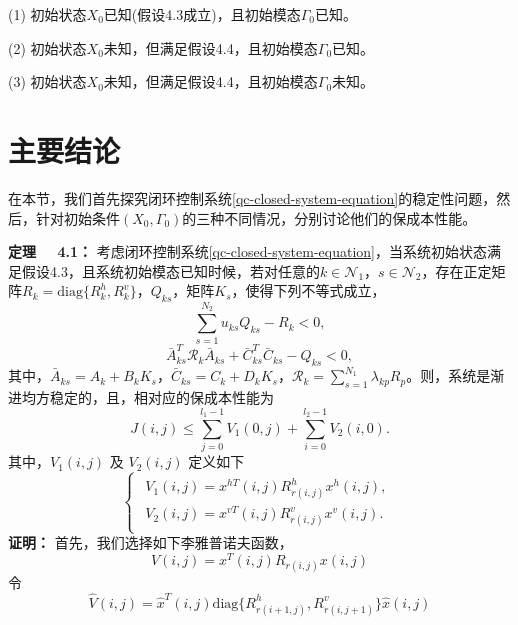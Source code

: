 	(1) 初始状态$X_{0}$已知(假设4.3成立)，且初始模态$\varGamma_{0}$已知。
	
	(2) 初始状态$X_{0}$未知，但满足假设4.4，且初始模态$\varGamma_{0}$已知。
	
	(3) 初始状态$X_{0}$未知，但满足假设4.4，且初始模态$\varGamma_{0}$未知。
	

\section{主要结论}
	在本节，我们首先探究闭环控制系统\eqref{qc-closed-system-equation}的稳定性问题，然后，针对初始条件$(X_{0}, \varGamma_{0})$的三种不同情况，分别讨论他们的保成本性能。
	
	{\bf 定理 \ \ 4.1：} 
	考虑闭环控制系统\eqref{qc-closed-system-equation}，当系统初始状态满足假设4.3，且系统初始模态已知时候，若对任意的$k\in\mathcal{N}_{1}$，$s\in\mathcal{N}_2$，存在正定矩阵$R_{k}=\mathrm{diag}\{R^{h}_{k},R^{v}_{k}\}$，$Q_{ks}$，矩阵$K_{s}$，使得下列不等式成立，
	\begin{equation}\label{qc-T1-1}
	\sum_{s=1}^{N_2}u_{ks}Q_{ks}-R_{k}< 0,
	\end{equation}
	\begin{equation}\label{qc-T1-2}
	\bar{A}^{T}_{ks}\mathcal{R}_{k}\bar{A}_{ks}+\bar{C}^{T}_{ks}\bar{C}_{ks}-Q_{ks}<0,
	\end{equation}
	其中，$\bar{A}_{ks}=A_{k}+B_kK_s$，$\bar{C}_{ks}=C_k+D_kK_s$，$\mathcal{R}_{k}=\sum_{s =1}^{N_1}\lambda_{kp}R_p$。则，系统是渐进均方稳定的，且，相对应的保成本性能为
	\begin{equation}\label{qcT1C3}
		J(i,j)\leq  \sum_{j=0}^{l_1-1}V_{1}(0,j)+\sum_{i=0}^{l_2-1}V_2(i,0).
	\end{equation}
	其中，$V_{1}(i,j)$ 及 $V_{2}(i,j)$ 定义如下  
	\begin{equation*}
	\left\{
	\begin{array}{lr}
	\begin{split}
	V_{1}(i,j)=x^{hT}(i,j)R^{h}_{r(i,j)}x^{h}(i,j),\\
	V_{2}(i,j)=x^{vT}(i,j)R^{v}_{r(i,j)}x^{v}(i,j).
	\end{split}
	\end{array}
	\right.
	\end{equation*}
	{\bf 证明：} 
	首先，我们选择如下李雅普诺夫函数，
	\begin{equation*}
		V(i,j) = x^{T}(i,j)R_{r(i,j)}x(i,j)
	\end{equation*}
	令
	\begin{equation*}
	\hat{V}(i,j) = \hat{x}^{T}(i,j)\mathrm{diag}\{R^{h}_{r(i+1,j)},R^{v}_{r(i,j+1)}\}\hat{x}(i,j)
	\end{equation*}
